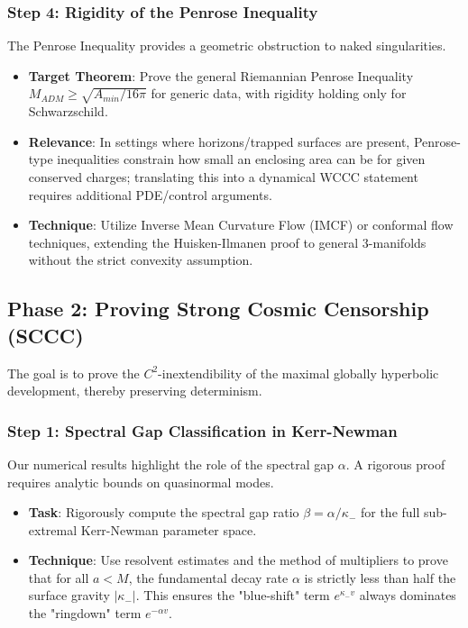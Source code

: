 \documentclass[12pt,a4paper]{article}
\begin{document}
\subsubsection{Step 4: Rigidity of the Penrose Inequality}
The Penrose Inequality provides a geometric obstruction to naked singularities.
\begin{itemize}
    \item \textbf{Target Theorem}: Prove the general Riemannian Penrose Inequality $M_{ADM} \geq \sqrt{A_{min}/16\pi}$ for generic data, with rigidity holding only for Schwarzschild.
    \item \textbf{Relevance}: In settings where horizons/trapped surfaces are present, Penrose-type inequalities constrain how small an enclosing area can be for given conserved charges; translating this into a dynamical WCCC statement requires additional PDE/control arguments.
    \item \textbf{Technique}: Utilize Inverse Mean Curvature Flow (IMCF) or conformal flow techniques, extending the Huisken-Ilmanen proof to general 3-manifolds without the strict convexity assumption.
\end{itemize}

\subsection{Phase 2: Proving Strong Cosmic Censorship (SCCC)}

The goal is to prove the $C^2$-inextendibility of the maximal globally hyperbolic development, thereby preserving determinism.

\subsubsection{Step 1: Spectral Gap Classification in Kerr-Newman}
Our numerical results highlight the role of the spectral gap $\alpha$. A rigorous proof requires analytic bounds on quasinormal modes.
\begin{itemize}
    \item \textbf{Task}: Rigorously compute the spectral gap ratio $\beta = \alpha/\kappa_-$ for the full sub-extremal Kerr-Newman parameter space.
    \item \textbf{Technique}: Use resolvent estimates and the method of multipliers to prove that for all $a < M$, the fundamental decay rate $\alpha$ is strictly less than half the surface gravity $|\kappa_-|$. This ensures the "blue-shift" term $e^{\kappa_- v}$ always dominates the "ringdown" term $e^{-\alpha v}$.
\end{itemize}
\end{document}
